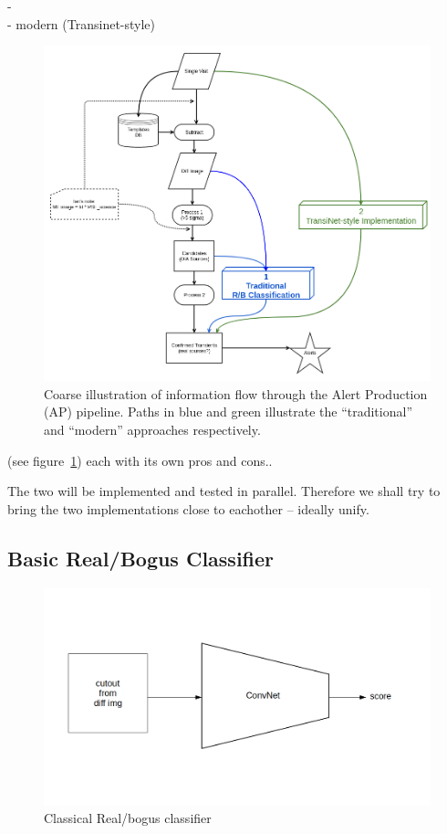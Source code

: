 - 
\\- modern (Transinet-style)\\

\begin{figure}[h]
  \centering
  \includegraphics[width=.8\textwidth]{material/diagram}
  \caption{Coarse illustration of information flow through the Alert Production (AP) pipeline. Paths in blue and green illustrate the ``traditional'' and ``modern'' approaches respectively.}
  \label{fig:diagram}
\end{figure}


(see figure~\ref{fig:diagram})
each with its own pros and cons..

The two will be implemented and tested in parallel. Therefore we shall try to bring the two implementations close to eachother -- ideally unify.


\subsection{Basic Real/Bogus Classifier}

\begin{figure}[h]
  \centering
  \includegraphics[width=.8\textwidth]{material/rb-classifier}
  \caption{Classical Real/bogus classifier}
  \label{fig:rbdiagram}
\end{figure}

